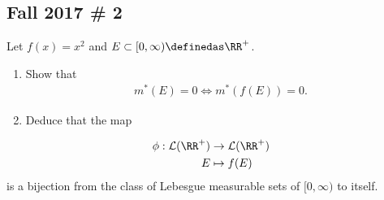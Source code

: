 \begin{solution}
\end{solution}

\hypertarget{fall-2017-2}{%
\subsection{Fall 2017 \# 2}\label{fall-2017-2}}

Let \(f(x) = x^2\) and \(E \subset [0, \infty) \definedas \RR^+\).

\begin{enumerate}
\def\labelenumi{\arabic{enumi}.}
\item
  Show that
  \begin{align*}
  m^*(E) = 0 \iff m^*(f(E)) = 0.
  \end{align*}
\item
  Deduce that the map
\end{enumerate}

\begin{align*}
\phi: \mathcal{L}(\RR^+) &\to \mathcal{L}(\RR^+) \\
E &\mapsto f(E)
\end{align*} is a bijection from the class of Lebesgue measurable sets
of \([0, \infty)\) to itself.

